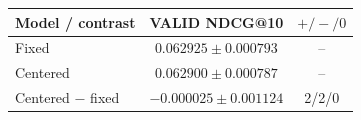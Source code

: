 \begin{tabular}{lcc}
\hline
Model / contrast & VALID NDCG@10 & $+/-/0$ \\
\hline
Fixed & $0.062925 \pm 0.000793$ & -- \\
Centered & $0.062900 \pm 0.000787$ & -- \\
Centered $-$ fixed & $-0.000025 \pm 0.001124$ & 2/2/0 \\
\hline
\end{tabular}
